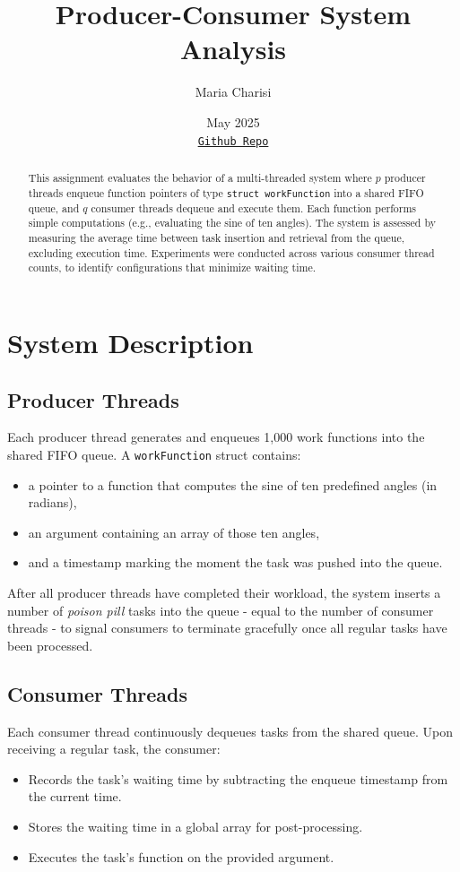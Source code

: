 \documentclass[11pt]{article}
\title{Producer-Consumer System Analysis}
\author{Maria Charisi}
\date{May 2025\\ 
\href{https://github.com/mariaxarisi/Producer-Consumer}{\texttt{Github Repo}}}
\begin{document}
\maketitle

\begin{abstract}
This assignment evaluates the behavior of a multi-threaded system where $p$ producer threads enqueue function pointers of type \texttt{struct workFunction} into a shared FIFO queue, and $q$ consumer threads dequeue and execute them. Each function performs simple computations (e.g., evaluating the sine of ten angles). The system is assessed by measuring the average time between task insertion and retrieval from the queue, excluding execution time. Experiments were conducted across various consumer thread counts, to identify configurations that minimize waiting time.
\end{abstract}

\section{System Description}

\subsection{Producer Threads}

Each producer thread generates and enqueues 1,000 work functions into the shared FIFO queue. A \texttt{workFunction} struct contains:
\begin{itemize}
    \item a pointer to a function that computes the sine of ten predefined angles (in radians),
    \item an argument containing an array of those ten angles,
    \item and a timestamp marking the moment the task was pushed into the queue.
\end{itemize}

After all producer threads have completed their workload, the system inserts a number of \emph{poison pill} tasks into the queue - equal to the number of consumer threads - to signal consumers to terminate gracefully once all regular tasks have been processed.

\subsection{Consumer Threads}

Each consumer thread continuously dequeues tasks from the shared queue. Upon receiving a regular task, the consumer:
\begin{itemize}
    \item Records the task's waiting time by subtracting the enqueue timestamp from the current time.
    \item Stores the waiting time in a global array for post-processing.
    \item Executes the task's function on the provided argument.
\end{itemize}
\end{document}
